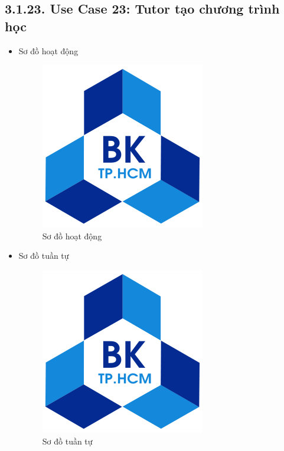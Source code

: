 \subsection*{3.1.23. Use Case 23: Tutor tạo chương trình học}
\begin{itemize}
    \item Sơ đồ hoạt động
    \begin{figure}[H]
    \centering
    \includegraphics[scale=0.5 ]{Picture/hcmut.png}
    \caption{Sơ đồ hoạt động }
    \end{figure}
    \item Sơ đồ tuần tự
    \begin{figure}[H]
    \centering
    \includegraphics[scale=0.5 ]{Picture/hcmut.png}
    \caption{Sơ đồ tuần tự }
    \end{figure}
\end{itemize}
